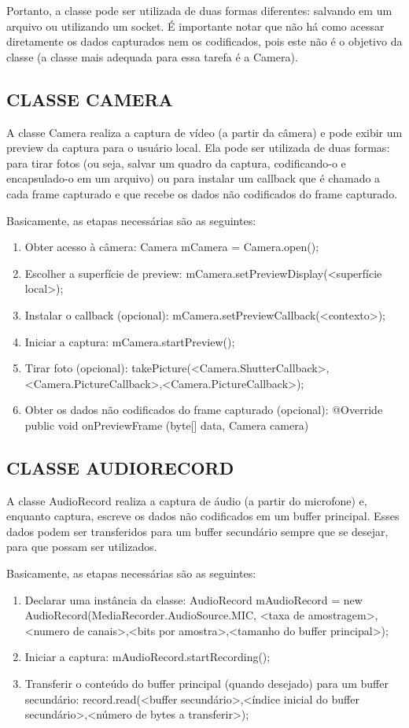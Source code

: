 \documentclass{acm_proc_article-sp}
\begin{document}
Portanto, a classe pode ser utilizada de duas formas diferentes: salvando em um arquivo ou utilizando um socket. É importante notar que não há como acessar diretamente os dados capturados nem os codificados, pois este não é o objetivo da classe (a classe mais adequada para essa tarefa é a Camera).

\subsection{CLASSE CAMERA}
A classe Camera realiza a captura de vídeo (a partir da câmera) e pode exibir um preview da captura para o usuário local. Ela pode ser utilizada de duas formas: para tirar fotos (ou seja, salvar um quadro da captura, codificando-o e encapsulado-o em um arquivo) ou para instalar um callback que é chamado a cada frame capturado e que recebe os dados não codificados do frame capturado.

Basicamente, as etapas necessárias são as seguintes:
\begin{enumerate}
 \item Obter acesso à câmera:
Camera mCamera = Camera.open();
 \item Escolher a superfície de preview:
mCamera.setPreviewDisplay(<superfície local>);
 \item Instalar o callback (opcional):
mCamera.setPreviewCallback(<contexto>);
 \item Iniciar a captura:
mCamera.startPreview();
 \item Tirar foto (opcional):
takePicture(<Camera.ShutterCallback>,<Camera.PictureCallback>,<Camera.PictureCallback>);
 \item Obter os dados não codificados do frame capturado (opcional):
@Override public void onPreviewFrame (byte[] data, Camera camera){}
\end{enumerate}

\subsection{CLASSE AUDIORECORD}
A classe AudioRecord realiza a captura de áudio (a partir do microfone) e, enquanto captura, escreve os dados não codificados em um buffer principal. Esses dados podem ser transferidos para um buffer secundário sempre que se desejar, para que possam ser utilizados.

Basicamente, as etapas necessárias são as seguintes:
\begin{enumerate}
 \item Declarar uma instância da classe:
AudioRecord mAudioRecord = new AudioRecord(MediaRecorder.AudioSource.MIC, <taxa de amostragem>,<numero de canais>,<bits por amostra>,<tamanho do buffer principal>);
 \item Iniciar a captura:
mAudioRecord.startRecording();
 \item Transferir o conteúdo do buffer principal (quando desejado) para um buffer secundário:
record.read(<buffer secundário>,<índice inicial do buffer secundário>,<número de bytes a transferir>);
\end{enumerate}
\end{document}

